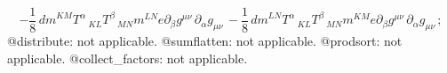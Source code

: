 \documentclass[11pt]{article}
\begin{document}
\begin{dmath*}[compact, spread=2pt]
 - \frac{1}{8}\, {dm}^{K M} {T}^{\alpha}\,_{K L} {T}^{\beta}\,_{M N} {m}^{L N} e {\partial}_{\beta}{{g}^{\mu \nu}}\,  {\partial}_{\alpha}{{g}_{\mu \nu}}\,  - \frac{1}{8}\, {dm}^{L N} {T}^{\alpha}\,_{K L} {T}^{\beta}\,_{M N} {m}^{K M} e {\partial}_{\beta}{{g}^{\mu \nu}}\,  {\partial}_{\alpha}{{g}_{\mu \nu}}\, ;
\end{dmath*}
@distribute: not applicable.
@sumflatten: not applicable.
@prodsort: not applicable.
@collect\_factors: not applicable.
\end{document}
